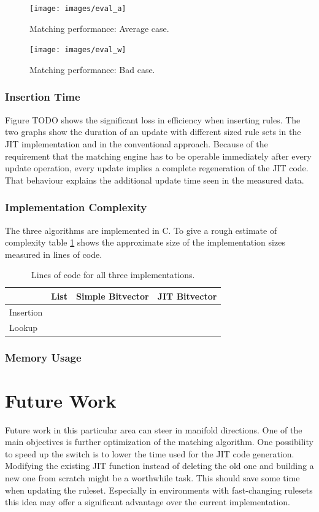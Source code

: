 \documentclass[a4paper,
		12pt,
		parskip=full,
		titlepage
		]{scrartcl}
\begin{document}
\begin{figure}
\centering
\texttt{[image: images/eval\_a]}
\caption{Matching performance: Average case.}
\label{fig:eval_average_case}
\end{figure}

\begin{figure}
\centering
\texttt{[image: images/eval\_w]}
\caption{Matching performance: Bad case.}
\label{fig:eval_bad_case}
\end{figure}

\subsubsection{Insertion Time}
Figure TODO shows the significant loss in efficiency when inserting rules. %
The two graphs show the duration of an update with different sized rule sets in the JIT implementation and in the conventional approach.
Because of the requirement that the matching engine has to be operable 
immediately after every update operation, every update implies a complete regeneration of the JIT code.
That behaviour explains the additional update time seen in the measured data. 

\subsubsection{Implementation Complexity}
The three algorithms are implemented in C.
To give a rough estimate of complexity table \ref{table:loc} shows the approximate size of the implementation sizes measured in lines of code.

\begin{table}
  \centering
  \begin{tabularx}{\textwidth}{l|XXX}
  &List&Simple Bitvector&JIT Bitvector\\
  \hline
  Insertion&&&\\
  Lookup&&&\\
  \end{tabularx}
  \caption{Lines of code for all three implementations.}
  \label{table:loc}
\end{table}

\subsubsection{Memory Usage}

\section{Future Work}
Future work in this particular area can steer in manifold directions.
One of the main objectives is further optimization of the matching algorithm.
One possibility to speed up the switch is to lower the time used for the JIT code generation.
Modifying the existing JIT function instead of deleting the old one and building 
a new one from scratch might be a worthwhile task.
This should save some time when updating the ruleset.
Especially in environments with fast-changing rulesets this idea may offer 
a significant advantage over the current implementation.
\end{document}
